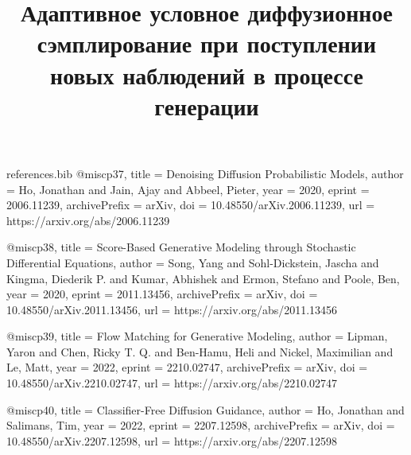 \begin{filecontents*}{references.bib}
@misc{p37,
  title = {{Denoising Diffusion Probabilistic Models}},
  author = {Ho, Jonathan and Jain, Ajay and Abbeel, Pieter},
  year = {2020},
  eprint = {2006.11239},
  archivePrefix = {arXiv},
  doi = {10.48550/arXiv.2006.11239},
  url = {https://arxiv.org/abs/2006.11239}
}

@misc{p38,
  title = {{Score-Based Generative Modeling through Stochastic Differential Equations}},
  author = {Song, Yang and Sohl-Dickstein, Jascha and Kingma, Diederik P. and Kumar, Abhishek and Ermon, Stefano and Poole, Ben},
  year = {2020},
  eprint = {2011.13456},
  archivePrefix = {arXiv},
  doi = {10.48550/arXiv.2011.13456},
  url = {https://arxiv.org/abs/2011.13456}
}

@misc{p39,
  title = {{Flow Matching for Generative Modeling}},
  author = {Lipman, Yaron and Chen, Ricky T. Q. and Ben-Hamu, Heli and Nickel, Maximilian and Le, Matt},
  year = {2022},
  eprint = {2210.02747},
  archivePrefix = {arXiv},
  doi = {10.48550/arXiv.2210.02747},
  url = {https://arxiv.org/abs/2210.02747}
}

@misc{p40,
  title = {{Classifier-Free Diffusion Guidance}},
  author = {Ho, Jonathan and Salimans, Tim},
  year = {2022},
  eprint = {2207.12598},
  archivePrefix = {arXiv},
  doi = {10.48550/arXiv.2207.12598},
  url = {https://arxiv.org/abs/2207.12598}
}

\end{filecontents*}

\documentclass{article}
\usepackage[main,final]{neurips_2025}
\usepackage{fontspec}
\usepackage[russian]{babel}
\setmainfont{cmunrm.otf}[BoldFont=cmunbx.otf,ItalicFont=cmunti.otf,BoldItalicFont=cmunbi.otf]
\setsansfont{cmunss.otf}
\setmonofont{cmuntt.otf}
\usepackage[hidelinks]{hyperref}
\usepackage{url}
\usepackage{booktabs}
\usepackage{amsmath,amssymb}
\makeatletter
\renewcommand{\@noticestring}{Исследовательский проект.}
\makeatother
\renewenvironment{abstract}{\vskip 0.075in\centerline{\large\bfseries\abstractname}\vspace{0.5ex}\begin{quote}}{\par\end{quote}\vskip 1ex}
\setlength{\emergencystretch}{2em}
\title{Адаптивное условное диффузионное сэмплирование при поступлении новых наблюдений в процессе генерации}
\author{}

